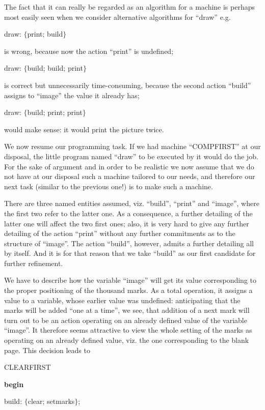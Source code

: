 \documentclass[twoside,11pt]{book}
\begin{document}
The fact that it can really be regarded as an algorithm for a machine is perhaps most easily seen when we consider alternative algorithms for ``draw'' e.g.

draw: $\{$print; build$\}$

\noindent
is wrong, because now the action ``print'' is undefined;

draw: $\{$build; build; print$\}$

\noindent
is correct but unnecessarily time-consuming, because the second action ``build'' assigns to ``image'' the value it already has;

draw: $\{$build; print; print$\}$

\noindent
would make sense: it would print the picture twice.

We now resume our programming task. If we had machine ``COMPFIRST'' at our disposal, the little program named ``draw'' to be executed by it would do the job. For the sake of argument and in order to be realistic we now assume that we do not have at our disposal such a machine tailored to our needs, and therefore our next task (similar to the previous one!) is to make such a machine.

There are three named entities assumed, viz. ``build'', ``print'' and ``image'', where the first two refer to the latter one. As a consequence, a further detailing of the latter one will affect the two first ones; also, it is very hard to give any further detailing of the action ``print'' without any further commitments as to the structure of ``image''. The action ``build'', however, admits a further detailing all by itself. And it is for that reason that we take ``build'' as our first candidate for further refinement.

We have to describe how the variable ``image'' will get its value corresponding to the proper positioning of the thousand marks. As a total operation, it assigns a value to a variable, whose earlier value was undefined: anticipating that the marks will be added ``one at a time'', we see, that addition of a next mark will turn out to be an action operating on an already defined value of the variable ``image''. It therefore seems attractive to view the whole setting of the marks as operating on an already defined value, viz. the one corresponding to the blank page. This decision leads to

CLEARFIRST

\textbf{begin}

\quad build: $\{$clear; setmarks$\}$;
\end{document}
